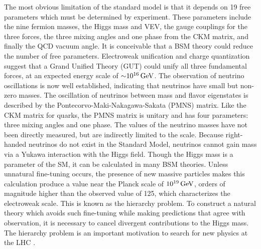 The most obvious limitation of the standard model is that it depends on 19 free parameters which must be determined by experiment. These parameters include the nine fermion masses, the Higgs mass and VEV, the gauge couplings for the three forces, the three mixing angles and one phase from the CKM matrix, and finally the QCD vacuum angle. It is conceivable that a BSM theory could reduce the number of free parameters. Electroweak unification and charge quantization suggest that a Grand Unified Theory (GUT) could unify all three fundamental forces, at an expected energy scale of ${\sim} 10^{16}\,\text{Ge\hspace{-.08em}V}$. The observation of neutrino oscillations is now well established, indicating that neutrinos have small but non-zero masses. The oscillation of neutrinos between mass and flavor eigenstates is described by the Pontecorvo-Maki-Nakagawa-Sakata (PMNS) matrix. Like the CKM matrix for quarks, the PMNS matrix is unitary and has four parameters: three mixing angles and one phase. The values of the neutrino masses have not been directly measured, but are indirectly limited to the \eVns scale. Because right-handed neutrinos do not exist in the Standard Model, neutrinos cannot gain mass via a Yukawa interaction with the Higgs field. Though the Higgs mass is a parameter of the SM, it can be calculated in many BSM theories. Unless unnatural fine-tuning occurs, the presence of new massive particles makes this calculation produce a value near the Planck scale of $10^{19}\,\text{Ge\hspace{-.08em}V}$, orders of magnitude higher than the observed value of 125\GeV, which characterizes the electroweak scale. This is known as the hierarchy problem. To construct a natural theory which avoids such fine-tuning while making predictions that agree with observation, it is necessary to cancel divergent contributions to the Higgs mass. The hierarchy problem is an important motivation to search for new physics at the LHC \cite{Morrissey20121}.

